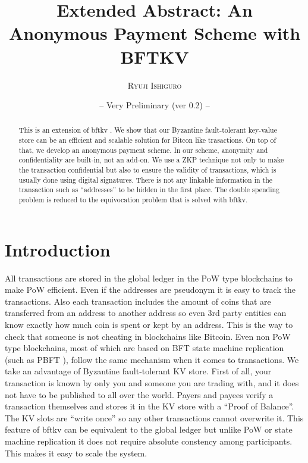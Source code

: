 \documentclass[10pt,fleqn]{article}
\title{Extended Abstract: An Anonymous Payment Scheme with BFTKV}
\author{%
  \textsc{Ryuji Ishiguro}\\%
}
\date{{\small -- Very Preliminary (ver 0.2) --}}
\begin{document}
\maketitle

\begin{abstract}

This is an extension of \textsf{bftkv} \cite{bftkv}. We show that our Byzantine fault-tolerant key-value store can be an efficient and scalable solution for Bitcon like trasactions. On top of that, we develop an anonymous payment scheme. In our scheme, anonymity and confidentiality are built-in, not an add-on. We use a ZKP technique not only to make the transaction confidential but also to ensure the validity of transactions, which is usually done using digital signatures. There is not any linkable information in the transaction such as ``addresses'' to be hidden in the first place. The double spending problem is reduced to the equivocation problem that is solved with \textsf{bftkv}.

\end{abstract}

\section{Introduction}
All transactions are stored in the global ledger in the PoW type blockchains to make PoW efficient. Even if the addresses are pseudonym it is easy to track the transactions. Also each transaction includes the amount of coins that are transferred from an address to another address so even 3rd party entities can know exactly how much coin is spent or kept by an address. This is the way to check that someone is not cheating in blockchains like Bitcoin. Even non PoW type blockchains, most of which are based on BFT state machine replication (such as PBFT \cite{pbft}), follow the same mechanism when it comes to transactions. We take an advantage of Byzantine fault-tolerant KV store. First of all, your transaction is known by only you and someone you are trading with, and it does not have to be published to all over the world. Payers and payees verify a transaction themselves and stores it in the KV store with a ``Proof of Balance''. The KV slots are ``write once'' so any other transactions cannot overwrite it. This feature of \textsf{bftkv} can be equivalent to the global ledger but unlike PoW or state machine replication it does not require absolute constency among participants. This makes it easy to scale the system. 
\end{document}
